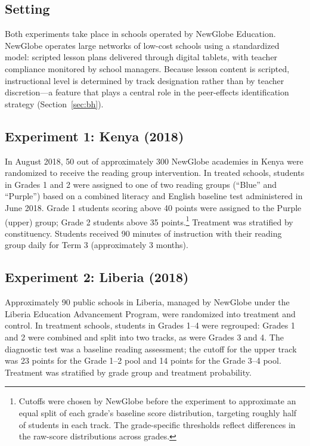 \documentclass[11pt]{article}
\begin{document}
\subsection{Setting}

Both experiments take place in schools operated by NewGlobe Education. NewGlobe operates large networks of low-cost schools using a standardized model: scripted lesson plans delivered through digital tablets, with teacher compliance monitored by school managers. Because lesson content is scripted, instructional level is determined by track designation rather than by teacher discretion---a feature that plays a central role in the peer-effects identification strategy (Section~\ref{sec:bh}).

\subsection{Experiment 1: Kenya (2018)}

In August 2018, 50 out of approximately 300 NewGlobe academies in Kenya were randomized to receive the reading group intervention. In treated schools, students in Grades 1 and 2 were assigned to one of two reading groups (``Blue'' and ``Purple'') based on a combined literacy and English baseline test administered in June 2018. Grade 1 students scoring above 40 points were assigned to the Purple (upper) group; Grade 2 students above 35 points.\footnote{Cutoffs were chosen by NewGlobe before the experiment to approximate an equal split of each grade's baseline score distribution, targeting roughly half of students in each track. The grade-specific thresholds reflect differences in the raw-score distributions across grades.} Treatment was stratified by constituency. Students received 90 minutes of instruction with their reading group daily for Term 3 (approximately 3 months).

\subsection{Experiment 2: Liberia (2018)}

Approximately 90 public schools in Liberia, managed by NewGlobe under the Liberia Education Advancement Program, were randomized into treatment and control. In treatment schools, students in Grades 1--4 were regrouped: Grades 1 and 2 were combined and split into two tracks, as were Grades 3 and 4. The diagnostic test was a baseline reading assessment; the cutoff for the upper track was 23 points for the Grade 1--2 pool and 14 points for the Grade 3--4 pool. Treatment was stratified by grade group and treatment probability.
\end{document}
